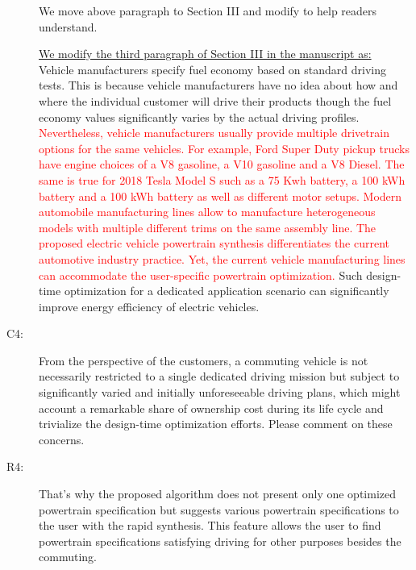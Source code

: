 \documentclass[onecolumn]{IEEEconf}
\begin{document}
\begin{description}
We move above paragraph to Section III and modify to help readers understand. 

\underline{We modify the third paragraph of Section III in the manuscript as:}\\
Vehicle manufacturers specify fuel economy based on standard driving tests. This is because vehicle manufacturers have no idea about how and where the individual customer will drive their products though the fuel economy values significantly varies by the actual driving profiles. \textcolor{red}{Nevertheless, vehicle manufacturers usually provide multiple drivetrain options for the same vehicles. For example, Ford Super Duty pickup trucks have engine choices of a V8 gasoline, a V10 gasoline and a V8 Diesel. The same is true for 2018 Tesla Model S such as a 75 Kwh battery, a 100 kWh battery and a 100 kWh battery as well as different motor setups. Modern automobile manufacturing lines allow to manufacture heterogeneous models with multiple different trims on the same assembly line. The proposed electric vehicle powertrain synthesis differentiates the current automotive industry practice. Yet, the current vehicle manufacturing lines can accommodate the user-specific powertrain optimization.} Such design-time optimization for a dedicated application scenario can significantly improve energy efficiency of electric vehicles. 


\item [C4:] From the perspective of the customers, a commuting vehicle is not necessarily restricted to a single dedicated driving mission but subject to significantly varied and initially unforeseeable driving plans, which might account a remarkable share of ownership cost during its life cycle and trivialize the design-time optimization efforts. Please comment on these concerns.
\item [R4: ] That's why the proposed algorithm does not present only one optimized powertrain specification but suggests various powertrain specifications to the user with the rapid synthesis. This feature allows the user to find powertrain specifications satisfying driving for other purposes besides the commuting.\\


\end{description}
\end{document}
